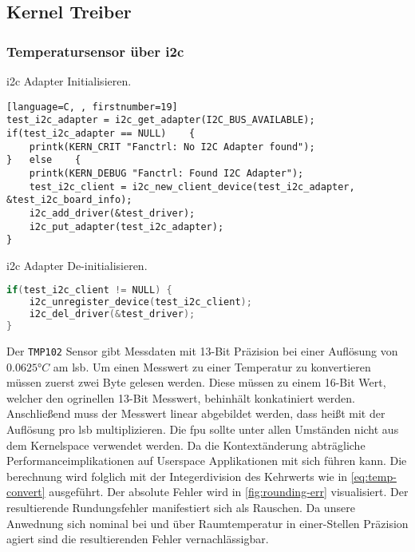\subsection{Kernel Treiber}
\subsubsection{Temperatursensor über \acrshort{i2c}}

\Gls{i2c} Adapter Initialisieren.
\begin{lstlisting}[language=C, , firstnumber=19]
test_i2c_adapter = i2c_get_adapter(I2C_BUS_AVAILABLE);
if(test_i2c_adapter == NULL)	{
    printk(KERN_CRIT "Fanctrl: No I2C Adapter found");
}	else	{
    printk(KERN_DEBUG "Fanctrl: Found I2C Adapter");
    test_i2c_client = i2c_new_client_device(test_i2c_adapter, &test_i2c_board_info);
    i2c_add_driver(&test_driver);
    i2c_put_adapter(test_i2c_adapter);
}
\end{lstlisting}

\Gls{i2c} Adapter De-initialisieren.
\begin{lstlisting}[language=C, firstnumber=31]
if(test_i2c_client != NULL)	{
    i2c_unregister_device(test_i2c_client);
    i2c_del_driver(&test_driver);
}
\end{lstlisting}

Der \texttt{TMP102} Sensor gibt Messdaten mit 13-Bit Präzision bei einer Auflösung von $0.0625\si{\degree C}$ am \gls{lsb}.
Um einen Messwert zu einer Temperatur zu konvertieren müssen zuerst zwei Byte gelesen werden.
Diese müssen zu einem 16-Bit Wert, welcher den ogrinellen 13-Bit Messwert, behinhält konkatiniert werden.
Anschlie{\ss}end muss der Messwert linear abgebildet werden, dass hei{\ss}t mit der Auflösung pro \gls{lsb} multiplizieren.
Die \gls{fpu} sollte unter allen Umständen nicht aus dem Kernelspace verwendet werden.
Da die Kontextänderung abträgliche Performanceimplikationen auf Userspace Applikationen mit sich führen kann.
Die berechnung wird folglich mit der Integerdivision des Kehrwerts wie in \autoref{eq:temp-convert} ausgeführt.
Der absolute Fehler wird in \autoref{fig:rounding-err} visualisiert.
Der resultierende Rundungsfehler manifestiert sich als Rauschen.
Da unsere Anwednung sich nominal bei und über Raumtemperatur in einer-Stellen Präzision agiert sind die resultierenden Fehler vernachlässigbar.

